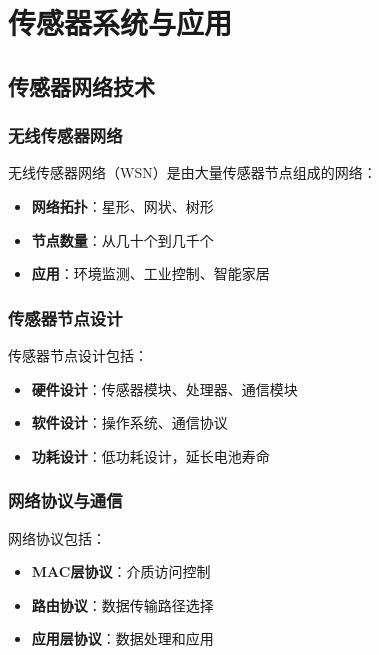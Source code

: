 \documentclass[12pt,UTF8]{ctexbook}
\begin{document}
\part{传感器系统与应用}

\chapter{传感器网络技术}

\section{无线传感器网络}

无线传感器网络（WSN）是由大量传感器节点组成的网络：

\begin{itemize}[leftmargin=2cm]
	\item \textbf{网络拓扑}：星形、网状、树形
	\item \textbf{节点数量}：从几十个到几千个
	\item \textbf{应用}：环境监测、工业控制、智能家居
\end{itemize}

\section{传感器节点设计}

传感器节点设计包括：

\begin{itemize}[leftmargin=2cm]
	\item \textbf{硬件设计}：传感器模块、处理器、通信模块
	\item \textbf{软件设计}：操作系统、通信协议
	\item \textbf{功耗设计}：低功耗设计，延长电池寿命
\end{itemize}

\section{网络协议与通信}

网络协议包括：

\begin{itemize}[leftmargin=2cm]
	\item \textbf{MAC层协议}：介质访问控制
	\item \textbf{路由协议}：数据传输路径选择
	\item \textbf{应用层协议}：数据处理和应用
\end{itemize}
\end{document}
